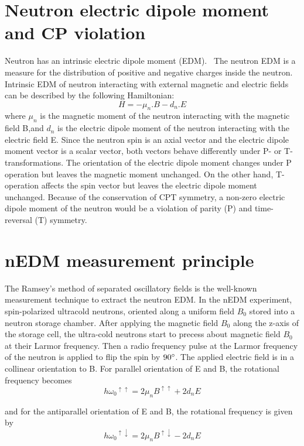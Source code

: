  \section{Neutron electric dipole moment and CP violation }  
 Neutron has an intrinsic electric dipole moment (EDM).  ~The neutron EDM is a measure for the distribution of positive and negative charges inside the neutron\cite{wiki:yyy}. Intrinsic EDM of neutron interacting with external magnetic and electric fields can be described by the following Hamiltonian:
\begin{equation}\label{my_first_eqn}  
  H=-\mu_n.B-d_n.E
\end{equation}
where $\mu_n$ is the magnetic moment of the neutron interacting with the magnetic field B,and $d_n$ is the electric dipole moment of the neutron interacting with the electric field E.
Since the neutron spin is an axial vector and the electric dipole moment vector is a scalar
vector, both vectors behave differently under P- or T-transformations.  The orientation of the electric dipole moment changes under P operation  but leaves the magnetic moment unchanged. On the other hand, T-operation affects the spin vector but leaves the electric dipole moment unchanged.
 Because of the conservation of CPT symmetry, a non-zero electric dipole moment of the neutron would be a violation of parity (P) and time-reversal (T) symmetry.

\section{nEDM measurement principle}
The Ramsey's method of separated oscillatory fields is the well-known measurement technique
to extract the neutron EDM. In the nEDM experiment, spin-polarized ultracold neutrons, oriented along a uniform field $B_0$ stored into a neutron storage chamber. After applying the magnetic field $B_0$ along the z-axis of the storage cell, the ultra-cold neutrons start to precess about magnetic field $B_0$ at their Larmor frequency.  Then a radio frequency pulse at the Larmor frequency of the neutron is applied to flip the spin by $90 \degree$. The applied electric field is in a collinear orientation to B.  For parallel orientation of E and B, the rotational frequency becomes
\begin{equation}\label{my_first_eqn}  
    h{\omega_0}^ {\uparrow\uparrow}=2\mu_n {B}^{\uparrow\uparrow}+ 2 d_nE
\end{equation}
            
and for the antiparallel orientation of E and B, the rotational frequency is given by
\begin{equation}\label{my_first_eqn}  
    h{\omega_0}^ {\uparrow\downarrow}=2\mu_n {B}^{\uparrow\downarrow}- 2 d_nE
\end{equation}

